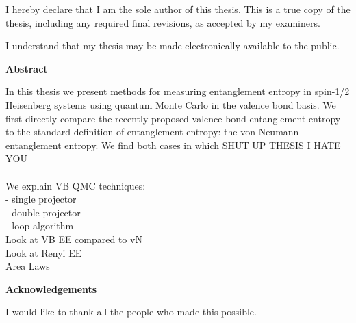 \cleardoublepage %
 


  \noindent
I hereby declare that I am the sole author of this thesis. This is a true copy of the thesis, including any required final revisions, as accepted by my examiners.

  \bigskip
  
  \noindent
I understand that my thesis may be made electronically available to the public.

\cleardoublepage


\begin{center}\textbf{Abstract}\end{center}

In this thesis we present methods for measuring entanglement entropy in spin-1/2 Heisenberg systems using quantum Monte Carlo 
in the valence bond basis.  We first directly compare the recently proposed valence bond entanglement entropy to the standard definition
of entanglement entropy: the von Neumann entanglement entropy.  We find both cases in which SHUT UP THESIS I HATE YOU
\\\\
We explain VB QMC techniques:\\
 - single projector\\
 - double projector\\
 - loop algorithm\\
Look at VB EE compared to vN\\
Look at Renyi EE\\
Area Laws\\

\cleardoublepage


\begin{center}\textbf{Acknowledgements}\end{center}

I would like to thank all the people who made this possible.
\cleardoublepage

